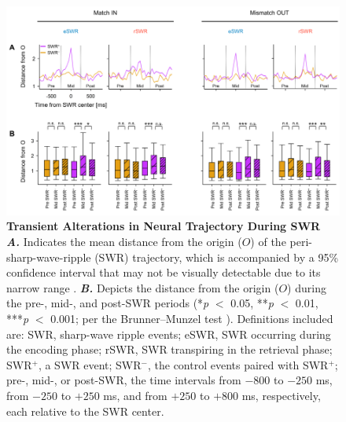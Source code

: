 \documentclass[final,3p,times,twocolumn]{elsarticle}
\begin{document}
        \clearpage
        \begin{figure}[ht]
        	\centering
            \includegraphics[width=1\textwidth]{./src/figures/.png/Figure_ID_05.png}
        	\caption{\textbf{Transient Alterations in Neural Trajectory During SWR}
\smallskip
\\
\textbf{\textit{A.}} Indicates the mean distance from the origin ($O$) of the peri-sharp-wave-ripple (SWR) trajectory, which is accompanied by a 95\% confidence interval that may not be visually detectable due to its narrow range \cite{girardeau_selective_2009,norman_hippocampal_2019,buzsaki_hippocampal_2015}. \textbf{\textit{B.}} Depicts the distance from the origin ($O$) during the pre-, mid-, and post-SWR periods (*\textit{p} $<$ 0.05, **\textit{p} $<$ 0.01, ***\textit{p} $<$ 0.001; per the Brunner--Munzel test \cite{boran_persistent_2019}). Definitions included are: SWR, sharp-wave ripple events; eSWR, SWR occurring during the encoding phase; rSWR, SWR transpiring in the retrieval phase; SWR$^+$, a SWR event; SWR$^-$, the control events paired with SWR$^+$; pre-, mid-, or post-SWR, the time intervals from $-800$ to $-250$ ms, from $-250$ to $+250$ ms, and from $+250$ to $+800$ ms, respectively, each relative to the SWR center.
}
        	\label{fig:05}
        \end{figure}
        \clearpage
\end{document}
